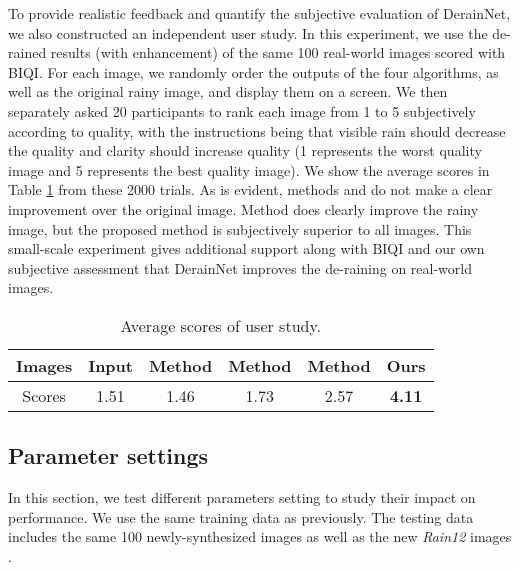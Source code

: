 \documentclass[journal]{IEEEtran}
\begin{document}
To provide realistic feedback and quantify the subjective evaluation of DerainNet, we also constructed an independent user study. In this experiment, we use the de-rained results (with enhancement) of the same 100 real-world images scored with BIQI. For each image, we randomly order the outputs of the four algorithms, as well as the original rainy image, and display them on a screen. We then separately asked 20 participants to rank each image from 1 to 5 subjectively according to quality, with the instructions being that visible rain should decrease the quality and clarity should increase quality (1 represents the worst quality image and 5 represents the best quality image).  We show the average scores in Table \ref{tab.User} from these 2000 trials. As is evident, methods \cite{13} and \cite{16} do not make a clear improvement over the original image. Method \cite{36} does clearly improve the rainy image, but the proposed method is subjectively superior to all images. This small-scale experiment gives 
additional support along with BIQI and our own subjective assessment that DerainNet improves the de-raining on real-world images.
\begin{table}
\caption{Average scores of user study.}
\label{tab.User}
\centering
\begin{tabular}{|c|c|c|c|c|c|}
\hline
Images &Input & Method \cite{13} & Method \cite{16} & Method \cite{34} &Ours\\
\hline
Scores&1.51 & 1.46  & 1.73 & 2.57 &\textbf{4.11}\\
\hline
\end{tabular}
\end{table}



\subsection{Parameter settings}
In this section, we test different parameters setting to study their impact on performance. We use the same training data as previously. The testing data includes the same 100 newly-synthesized images as well as the new \emph{Rain12} images \cite{34}.
\end{document}
